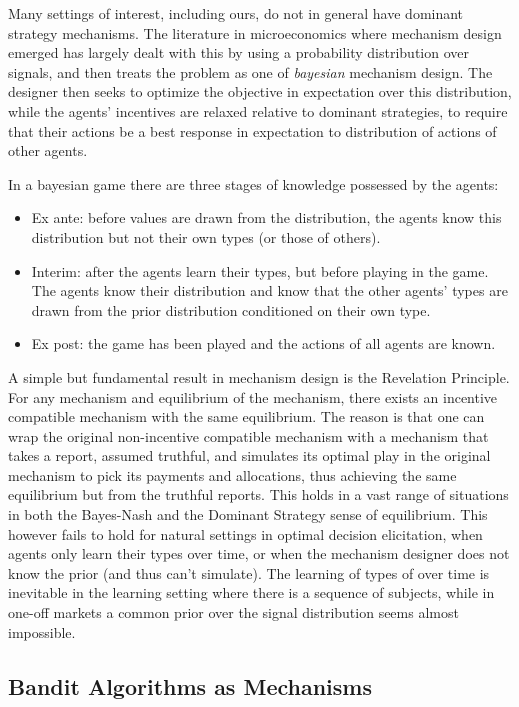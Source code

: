 Many settings of interest, including ours, do not in general have dominant strategy mechanisms. 
The literature in microeconomics where mechanism design emerged has largely dealt with this by using a probability distribution over signals, and then treats the problem as one of \emph{bayesian} mechanism design.
The designer then seeks to optimize the objective in expectation over this distribution, while the agents' incentives are relaxed relative to dominant strategies, to require that their actions be a best response in expectation to distribution of actions of other agents.

In a bayesian game there are three stages of knowledge possessed by the agents:
\begin{itemize}
 \item Ex ante: before values are drawn from the distribution, the agents know this distribution but not their own types (or those of others). 
 \item Interim: after the agents learn their types, but before playing in the game. The agents know their distribution and know that the other agents' types are drawn from the prior distribution conditioned on their own type.
 \item Ex post: the game has been played and the actions of all agents are known.
\end{itemize}

A simple but fundamental result in mechanism design is the Revelation Principle.
For any mechanism and equilibrium of the mechanism, there exists an incentive compatible mechanism with the same equilibrium.
The reason is that one can wrap the original non-incentive compatible mechanism with a mechanism that takes a report, assumed truthful, and simulates its optimal play in the original mechanism to pick its payments and allocations, thus achieving the same equilibrium but from the truthful reports. 
This holds in a vast range of situations in both the Bayes-Nash and the Dominant Strategy sense of equilibrium. 
This however fails to hold for natural settings in optimal decision elicitation, when agents only learn their types over time, or when the mechanism designer does not know the prior (and thus can't simulate).
The learning of types of over time is inevitable in the learning setting where there is a sequence of subjects, while in one-off markets a common prior over the signal distribution seems almost impossible.



\subsection{Bandit Algorithms as Mechanisms}

